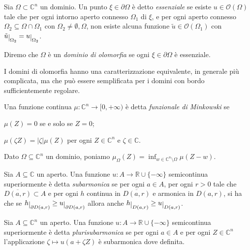 \begin{defn}
    Sia $\Omega \subset \mathbb{C}^n$ un dominio. Un punto $\xi\in\partial\Omega$ è detto \textit{essenziale} se esiste $u \in \mathcal{O}(\Omega)$ tale che per ogni intorno aperto connesso $\Omega_1$ di $\xi$, e per ogni aperto connesso $\Omega_2 \subseteq \Omega \cap \Omega_1$ con $\Omega_2\not=\emptyset,\Omega$, non esiste alcuna funzione $\tilde{u} \in \mathcal{O}(\Omega_1)$ con $\tilde{u}\restrict{\Omega_2}=u\restrict{\Omega_2}$.

    Diremo che $\Omega$ è un \textit{dominio di olomorfia} se ogni $\xi\in \partial\Omega$ è essenziale.
\end{defn}

I domini di olomorfia hanno una caratterizzazione equivalente, in generale più complicata, ma che può essere semplificata per i domini con bordo sufficientemente regolare.

\begin{defn}
    Una funzione continua $\mu:\mathbb{C}^n \longrightarrow [0,+\infty)$ è detta \textit{funzionale di Minkowski} se
    \begin{nlist}
        \item $\mu(Z)=0$ se e solo se $Z=0$;
        \item $\mu(\zeta Z)=|\zeta|\mu(Z)$ per ogni $Z \in \mathbb{C}^n$ e $\zeta\in\mathbb{C}$.
    \end{nlist}
    Dato $\Omega\subseteq\mathbb{C}^n$ un dominio, poniamo $\mu_{\Omega}(Z)=\displaystyle\inf_{w\in\mathbb{C}^n\setminus\Omega}\mu(Z-w)$.
\end{defn}

\begin{defn} \label{psh}
    Sia $A\subseteq\mathbb{C}$ un aperto. Una funzione $u:A \longrightarrow \mathbb{R}\cup\{-\infty\}$ semicontinua superiormente è detta \textit{subarmonica} se per ogni $a \in A$, per ogni $r>0$ tale che $\overline{D(a,r)} \subset A$ e per ogni $h$ continua in $\overline{D(a,r)}$ e armonica in $D(a,r)$, si ha che se $h\restrict{\partial D(a,r)} \ge u\restrict{\partial D(a,r)}$ allora anche $h\restrict{D(a,r)} \ge u \restrict{D(a,r)}$.

    Sia $A\subseteq\mathbb{C}^n$ un aperto. Una funzione $u:A \longrightarrow \mathbb{R}\cup\{-\infty\}$ semicontinua superiormente è detta \textit{plurisubarmonica} se per ogni $a \in A$ e per ogni $Z \in \mathbb{C}^n$ l'applicazione $\zeta \longmapsto u(a+\zeta Z)$ è subarmonica dove definita.
\end{defn}

